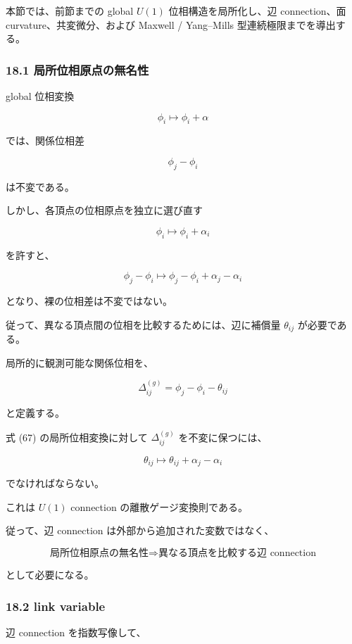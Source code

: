 \documentclass[
  a4paper,
]{ltjsarticle}
\begin{document}
本節では、前節までの global \(U(1)\) 位相構造を局所化し、辺
connection、面 curvature、共変微分、および Maxwell / Yang--Mills
型連続極限までを導出する。

\subsubsection{18.1
局所位相原点の無名性}\label{ux5c40ux6240ux4f4dux76f8ux539fux70b9ux306eux7121ux540dux6027}

global 位相変換

\[
\phi_i\mapsto\phi_i+\alpha
\]

では、関係位相差

\[
\phi_j-\phi_i
\]

は不変である。

しかし、各頂点の位相原点を独立に選び直す

\[
\boxed{
\phi_i\mapsto\phi_i+\alpha_i
}
\tag{67}
\]

を許すと、

\[
\phi_j-\phi_i
\mapsto
\phi_j-\phi_i+\alpha_j-\alpha_i
\]

となり、裸の位相差は不変ではない。

従って、異なる頂点間の位相を比較するためには、辺に補償量 \(\theta_{ij}\)
が必要である。

局所的に観測可能な関係位相を、

\[
\boxed{
\Delta_{ij}^{(g)}
=
\phi_j-\phi_i-\theta_{ij}
}
\tag{68}
\]

と定義する。

式 (67) の局所位相変換に対して \(\Delta_{ij}^{(g)}\) を不変に保つには、

\[
\boxed{
\theta_{ij}
\mapsto
\theta_{ij}
+
\alpha_j-\alpha_i
}
\tag{69}
\]

でなければならない。

これは \(U(1)\) connection の離散ゲージ変換則である。

従って、辺 connection は外部から追加された変数ではなく、

\[
\boxed{
\text{局所位相原点の無名性}
\Longrightarrow
\text{異なる頂点を比較する辺 connection}
}
\tag{70}
\]

として必要になる。

\subsubsection{18.2 link variable}\label{link-variable}

辺 connection を指数写像して、
\end{document}
